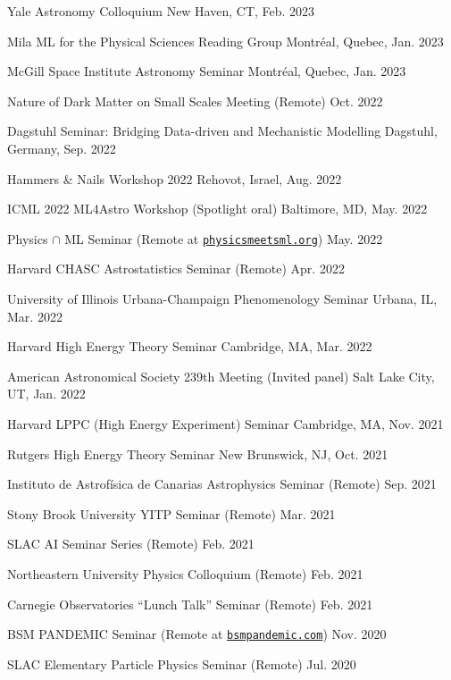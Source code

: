 \documentclass[letterpaper,11pt]{article}
\newenvironment{packed_itemize}{
\begin{itemize}[label=\raisebox{0.25ex}{\tiny$\bullet$}]
  \setlength{\itemsep}{4.2pt}
  \setlength{\parskip}{0pt}
  \setlength{\parsep}{0pt}}{\end{itemize}
}
\begin{document}
\begin{packed_itemize}
  \item Yale Astronomy Colloquium \hfill New Haven, CT, Feb. 2023
  \item Mila ML for the Physical Sciences Reading Group \hfill Montr\'eal, Quebec, Jan. 2023
  \item McGill Space Institute Astronomy Seminar \hfill Montr\'eal, Quebec, Jan. 2023
  \item Nature of Dark Matter on Small Scales Meeting (Remote) \hfill  Oct. 2022
  \item Dagstuhl Seminar: Bridging Data-driven and Mechanistic Modelling \hfill Dagstuhl, Germany, Sep. 2022
  \item Hammers \& Nails Workshop 2022 \hfill Rehovot, Israel, Aug. 2022
  \item ICML 2022 ML4Astro Workshop (Spotlight oral) \hfill Baltimore, MD, May. 2022
  \item Physics $\cap$ ML Seminar (Remote at \href{http://www.physicsmeetsml.org//}{\texttt{physicsmeetsml.org}}) \hfill May. 2022
  \item Harvard CHASC Astrostatistics Seminar (Remote)  \hfill Apr. 2022
  \item University of Illinois Urbana-Champaign Phenomenology Seminar  \hfill Urbana, IL, Mar. 2022
  \item Harvard High Energy Theory Seminar \hfill Cambridge, MA, Mar. 2022
  \item American Astronomical Society 239th Meeting (Invited panel)  \hfill Salt Lake City, UT, Jan. 2022
  \item Harvard LPPC (High Energy Experiment) Seminar \hfill Cambridge, MA, Nov. 2021
  \item Rutgers High Energy Theory Seminar \hfill New Brunswick, NJ, Oct. 2021
  \item Instituto de Astrof\'{i}sica de Canarias Astrophysics Seminar (Remote) \hfill Sep. 2021
  \item Stony Brook University YITP Seminar (Remote) \hfill Mar. 2021
  \item SLAC AI Seminar Series (Remote) \hfill Feb. 2021
  \item Northeastern University Physics Colloquium (Remote) \hfill Feb. 2021
  \item Carnegie Observatories ``Lunch Talk'' Seminar (Remote) \hfill Feb. 2021
  \item BSM PANDEMIC Seminar  (Remote at \href{https://www.bsmpandemic.com/}{\texttt{bsmpandemic.com}}) \hfill Nov. 2020
  \item SLAC Elementary Particle Physics Seminar (Remote) \hfill Jul. 2020

\end{packed_itemize}
\end{document}
